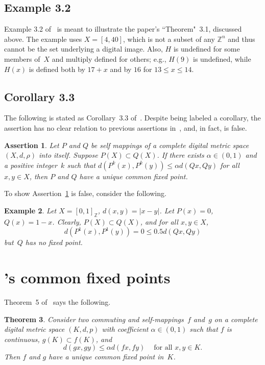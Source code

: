 \documentclass{article}
\newtheorem{thm}{Theorem}
\newtheorem{assert}[thm]{Assertion}
\newtheorem{exl}[thm]{Example}
\numberwithin{thm}{section}
\def\Z{{\mathbb Z}}
\begin{document}
\subsection{Example 3.2}
Example 3.2 of~\cite{Khan} is
meant to illustrate
the paper's ``Theorem"~3.1,
discussed above.
The example uses
$X=[4,40]$, which
is not a subset of
any $\Z^n$ and thus
cannot be the set
underlying a digital image.
Also, $H$ is undefined
for some members
of~$X$ and
multiply defined
for others; e.g.,
$H(9)$ is undefined,
while $H(x)$ is defined both by
$17+x$ and by $16$
for $13 \le x \le 14$.

\subsection{Corollary 3.3}
The following is
stated as 
Corollary~3.3
of~\cite{Khan}.
Despite being labeled a corollary,
the assertion has
no clear relation
to previous 
assertions in~\cite{Khan},
and, in fact, is
false.

\begin{assert}
\label{Khan3.3}
    Let $P$ and $Q$ be self 
    mappings of a complete 
    digital metric space 
    $(X, d, \rho)$ into itself. 
    Suppose $P(X) \subset Q(X)$.
    If there exists
    $\alpha \in (0,1)$
    and a positive integer~$k$ such that
    $d(P^k(x),P^k(y)) \le \alpha d(Qx,Qy)$ for
    all $x,y \in X$,
    then $P$ and
    $Q$ have a unique common
    fixed point.
\end{assert}

To show Assertion~\ref{Khan3.3} is false,
consider the following.

\begin{exl}
    Let $X = [0,1]_{\Z}$,
    $d(x,y) = |x-y|$. Let $P(x)=0$,
    $Q(x)=1-x$.
    Clearly, 
    $P(X) \subset Q(X)$, and for all $x,y \in X$,
    \[ d(P^1(x),P^1(y)) = 0 \le 0.5 d(Qx,Qy)
    \]
    but~$Q$
    has no fixed
    point.
\end{exl}

\section{\cite{MishraEtal}'s common fixed points}
Theorem~5 of~\cite{MishraEtal}
says the following.
\begin{thm}
    Consider two commuting and self-mappings~$f$ 
    and~$g$ on a complete digital metric space
    $(K,d,p)$  with coefficient $\alpha \in (0,1)$ such
    that $f$ is continuous, 
    $g(K) \subset f(K)$, and
    \[ d(gx,gy) \le  \alpha d(fx,fy)
    ~~~~\mbox{ for all } x,y \in K.
    \]
    Then $f$ and $g$ have a unique
    common fixed point in~$K$.
\end{thm}
\end{document}
